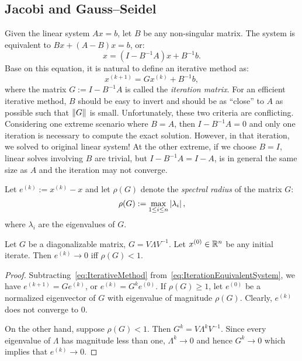 \subsection{Jacobi and Gauss--Seidel}

Given the linear system $Ax=b$, let $B$ be any non-singular matrix. The system is equivalent to $Bx + (A-B)x = b$, or:
\begin{equation}\label{eq:IterationEquivalentSystem}
x = (I-B^{-1}A)x + B^{-1}b.
\end{equation}
Base on this equation, it is natural to define an iterative method as:
\begin{equation}\label{eq:IterativeMethod}
x^{(k+1)} = G x^{(k)} + B^{-1}b,
\end{equation}
where the matrix $G := I-B^{-1}A$ is called the {\em iteration matrix}. For an efficient iterative method, $B$ should be easy to invert and should be as ``close'' to $A$ as possible such that $\left\|{G}\right\|$ is small. Unfortunately, these two criteria are conflicting. Considering one extreme scenario where $B=A$, then $I-B^{-1}A = 0$ and only one iteration is necessary to compute the exact solution. However, in that iteration, we solved to original linear system! At the other extreme, if we choose $B=I$, linear solves involving $B$ are trivial, but $I-B^{-1}A = I-A$, is in general the same size as $A$ and the iteration may not converge.

Let $e^{(k)} := x^{(k)} - x$ and let $\rho(G)$ denote the {\em spectral radius} of the matrix $G$:
\[
\rho(G) := \max_{1\le i\le n}\left|{\lambda_i}\right|,
\]
where $\lambda_i$ are the eigenvalues of $G$. 

\begin{theorem}
Let $G$ be a diagonalizable matrix, $G = V\Lambda V^{-1}$. Let $x^{(0)}\in\mathbb{R}^n$ be any initial iterate. Then $e^{(k)}\to 0$ iff $\rho(G)<1$.
\end{theorem}
\begin{proof}
Subtracting~\eqref{eq:IterativeMethod} from~\eqref{eq:IterationEquivalentSystem}, we have $e^{(k+1)} = Ge^{(k)}$, or $e^{(k)} = G^ke^{(0)}$. If $\rho(G)\ge1$, let $e^{(0)}$ be a normalized eigenvector of $G$ with eigenvalue of magnitude $\rho(G)$. Clearly, $e^{(k)}$ does not converge to $0$.

On the other hand, suppose $\rho(G)<1$. Then $G^k = V\Lambda^kV^{-1}$. Since every eigenvalue of $\Lambda$ has magnitude less than one, $\Lambda^k\to0$ and hence $G^k\to0$ which implies that $e^{(k)}\to0$.
\end{proof}

